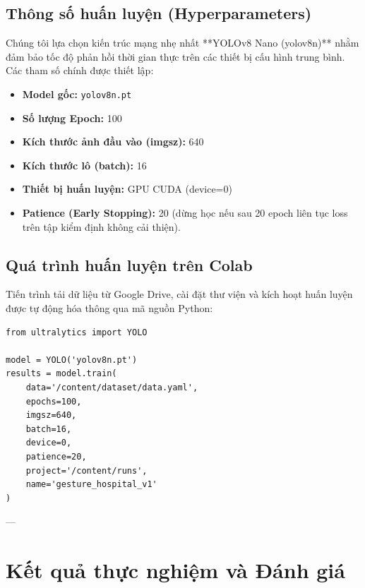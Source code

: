 \documentclass[12pt,a4paper]{article}
\begin{document}
\subsection{Thông số huấn luyện (Hyperparameters)}
Chúng tôi lựa chọn kiến trúc mạng nhẹ nhất **YOLOv8 Nano (yolov8n)** nhằm đảm bảo tốc độ phản hồi thời gian thực trên các thiết bị cấu hình trung bình. Các tham số chính được thiết lập:
\begin{itemize}
    \item \textbf{Model gốc:} \texttt{yolov8n.pt}
    \item \textbf{Số lượng Epoch:} 100
    \item \textbf{Kích thước ảnh đầu vào (imgsz):} 640
    \item \textbf{Kích thước lô (batch):} 16
    \item \textbf{Thiết bị huấn luyện:} GPU CUDA (device=0)
    \item \textbf{Patience (Early Stopping):} 20 (dừng học nếu sau 20 epoch liên tục loss trên tập kiểm định không cải thiện).
\end{itemize}

\subsection{Quá trình huấn luyện trên Colab}
Tiến trình tải dữ liệu từ Google Drive, cài đặt thư viện và kích hoạt huấn luyện được tự động hóa thông qua mã nguồn Python:
\begin{lstlisting}[caption={Lệnh kích hoạt huấn luyện YOLOv8}]
from ultralytics import YOLO

model = YOLO('yolov8n.pt')
results = model.train(
    data='/content/dataset/data.yaml',
    epochs=100,
    imgsz=640,
    batch=16,
    device=0,
    patience=20,
    project='/content/runs',
    name='gesture_hospital_v1'
)
\end{lstlisting}

---

\section{Kết quả thực nghiệm và Đánh giá}
\end{document}
